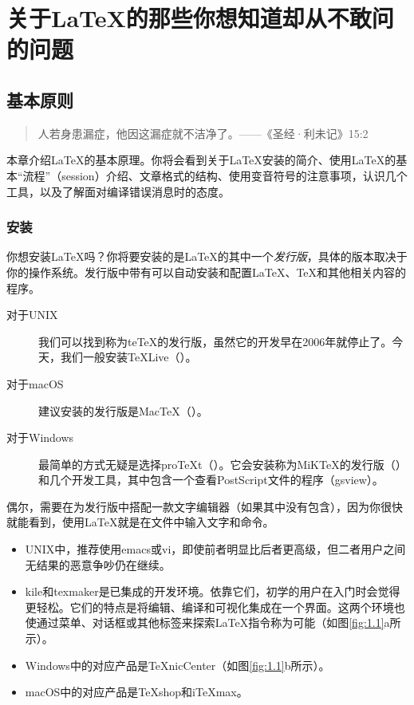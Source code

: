 \part{关于\LaTeX 的那些你想知道却从不敢问的问题}

\chapter{基本原则}
\begin{quote}
    人若身患漏症，他因这漏症就不洁净了。——《圣经·利未记》15:2
\end{quote}

本章介绍\LaTeX 的基本原理。你将会看到关于\LaTeX 安装的简介、使用\LaTeX 的基本“流程”（session）介绍、文章格式的结构、使用变音符号的注意事项，认识几个工具，以及了解面对编译错误消息时的态度。

\section{安装}

你想安装\LaTeX 吗？你将要安装的是\LaTeX 的其中一个\textit{发行版}，具体的版本取决于你的操作系统。发行版中带有可以自动安装和配置\LaTeX 、\TeX 和其他相关内容的程序。

\begin{description}
\item[对于UNIX]我们可以找到称为te\TeX 的发行版，虽然它的开发早在2006年就停止了。今天，我们一般安装\TeX Live（）。

\item[对于macOS]建议安装的发行版是Mac\TeX（）。

\item[对于Windows]最简单的方式无疑是选择pro\TeX t（）。它会安装称为MiK\TeX 的发行版（）和几个开发工具，其中包含一个查看PostScript文件的程序（\textsf{gsview}）。

\end{description}

偶尔，需要在为发行版中搭配一款文字编辑器（如果其中没有包含），因为你很快就能看到，使用\LaTeX 就是在文件中输入文字和命令。

\begin{itemize}
    \item UNIX中，推荐使用\textsf{emacs}或\textsf{vi}，即使前者明显比后者更高级，但二者用户之间无结果的恶意争吵仍在继续。
    \item \textsf{kile}和\textsf{texmaker}是已集成的开发环境。依靠它们，初学的用户在入门时会觉得更轻松。它们的特点是将编辑、编译和可视化集成在一个界面。这两个环境也使通过菜单、对话框或其他标签来探索\LaTeX 指令称为可能（如图\ref{fig:1.1}a所示）。
    \item Windows中的对应产品是\textsf{\TeX nicCenter}（如图\ref{fig:1.1}b所示）。
    \item macOS中的对应产品是\textsf{\TeX shop}和\textsf{i\TeX max}。
\end{itemize}

